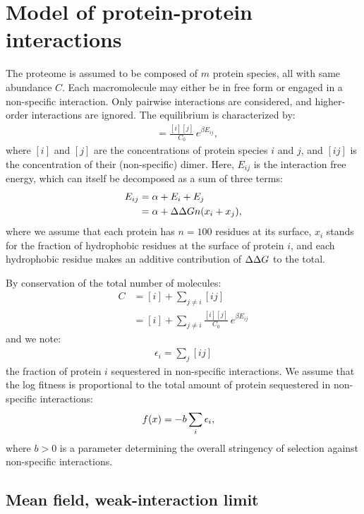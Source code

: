 \section{Model of protein-protein interactions}
\label{sec:model-of-protein-protein-interactions}

The proteome is assumed to be composed of $m$ protein species, all with same abundance $C$.
Each macromolecule may either be in free form or engaged in a non-specific interaction.
Only pairwise interactions are considered, and higher-order interactions are ignored.
The equilibrium is characterized by:
\begin{align}
[ij] & = \frac{[i][j]}{C_0} \, e^{\beta E_{ij}},
\end{align}
where $[i]$ and $[j]$ are the concentrations of protein species $i$ and $j$, and $[ij]$ is the concentration of their (non-specific) dimer. Here, $E_{ij}$ is the interaction free energy, which can itself be decomposed as a sum of three terms:
\begin{align}
E_{ij} & = \alpha + E_i + E_j
\\
& = \alpha + \Delta \Delta G n (x_i + x_j),
\end{align}
where we assume that each protein has $n=100$ residues at its surface, $x_i$ stands for the fraction of hydrophobic residues at the surface of protein $i$, and each hydrophobic residue makes an additive contribution of $\Delta \Delta G$ to the total.

By conservation of the total number of molecules:
\begin{align}
C & = [i] + \sum\limits_{j \neq i} [ij] \\
& = [i] + \sum\limits_{j \neq i} \frac{[i][j]}{C_0} \, e^{\beta E_{ij}}
\end{align}
and we note:
\begin{align}
\epsilon_i = \sum_j [ij]
\end{align}
the fraction of protein $i$ sequestered in non-specific interactions.
We assume that the log fitness is proportional to the total amount of protein sequestered in non-specific interactions:
\begin{align}
f (x) & = -b \sum_i \epsilon_i,
\end{align}
where $b>0$ is a parameter determining the overall stringency of selection against non-specific interactions.

\subsection{Mean field, weak-interaction limit}
\label{subsec:mean-field,-weak-interaction-limit}

